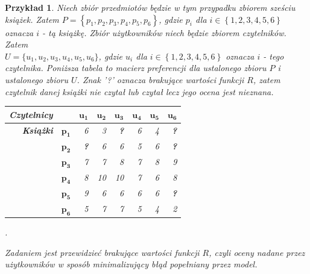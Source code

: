 \documentclass[12pt,a4paper]{report}
\newtheorem{przyklad}{Przykład}[chapter]
\newcommand{\set}[1]{\left\lbrace {#1} \right\rbrace}
\newcommand{\setUzytkownicy}{\mathit{U}}
\newcommand{\setPrzedmioty}{\mathit{P}}
\begin{document}
\begin{przyklad}
Niech zbiór przedmiotów będzie w tym przypadku zbiorem sześciu książek. Zatem $\setPrzedmioty = \set{p_1, p_2, p_3, p_4, p_5, p_6}$, gdzie $p_i$ dla $i \in \set{1,2,3,4,5,6}$ oznacza $i$ - tą książkę. Zbiór użytkowników niech będzie zbiorem czytelników. Zatem 
\\$\setUzytkownicy = \{u_1, u_2, u_3, u_4, u_5, u_6\}$, gdzie $u_i$ dla $i \in \set{1,2,3,4,5,6}$ oznacza $i$ - tego czytelnika.
Poniższa tabela to macierz preferencji dla ustalonego zbioru $\setPrzedmioty$ i ustalonego zbioru $\setUzytkownicy$. Znak '?' oznacza brakujące wartości funkcji $R$, zatem czytelnik danej książki nie czytał lub czytał lecz jego ocena jest nieznana.
\begin{center}
\begin{tabular}{|r|r|r|r|r|r|r|r|} \hline
\textbf{Czytelnicy} & & $\mathbf{u_1}$ & $\mathbf{u_2}$ & $\mathbf{u_3}$ & $\mathbf{u_4}$ & $\mathbf{u_5}$ & $\mathbf{u_6}$ \\
\hline
\hline
\textbf{Książki} &$\mathbf{p_1}$ & 6 & 3 & \textbf{?} & 6 & 4 & \textbf{?} \\
\hline
&$\mathbf{p_2}$ & \textbf{?} & 6 & 6 & 5 & 6 & \textbf{?} \\
\hline
&$\mathbf{p_3}$ & 7 & 7 & 8 & 7 & 8 & 9  \\
\hline
&$\mathbf{p_4}$ & 8 & 10 & 10 & 7 & 6 & 8 \\
\hline
&$\mathbf{p_5}$ & 9 & 6 & 6 & 6 & 6 & \textbf{?} \\
\hline
&$\mathbf{p_6}$ & 5 & 7 & 7 & 5 & 4 & 2 \\
\hline
\end{tabular}.
\end{center}

Zadaniem jest przewidzieć brakujące wartości funkcji $R$, czyli oceny nadane przez użytkowników w sposób minimalizujący błąd popełniany przez model.
\end{przyklad}
\end{document}
